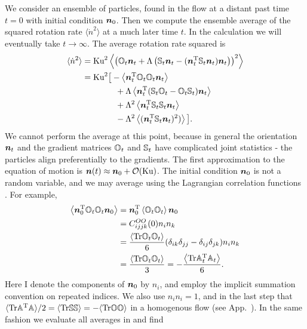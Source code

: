\documentclass[thesis.tex]{subfiles}
\begin{document}
We consider an ensemble of particles, found in the flow at a distant past time $t=0$ with initial condition $\mbox{\boldmath$n$}_0$. Then we compute the ensemble average of the squared rotation rate $\langle \dot n^2\rangle$ at a much later time $t$.
In the calculation we will eventually take $t\to\infty$. The average rotation rate squared is
\begin{align}
	\langle \dot n^2\rangle &= \ku^2\left\langle\left(\ma O_{t}\ve n_{t}+\Lambda\left(\ma S_{t}\ve n_{t}-(\ve n_{t}\transpose\ma S_{t}\ve n_{t})\ve n_{t}\right)\right)^2\right\rangle\nn \nn\\
	&= \ku^2\big[-\left\langle\ve n_{t}\transpose \ma O_{t} \ma O_{t} \ve n_{t}\right\rangle \nn\\
	&\qquad\qquad+ \Lambda\left\langle\ve n_{t}\transpose(\ma S_{t}\ma O_{t} - \ma O_{t}\ma S_{t})\ve n_t\right\rangle \nn\\
	&\qquad\qquad+ \Lambda^2\left\langle\ve n_{t}\transpose\ma S_{t}\ma S_{t}\ve n_{t}\right\rangle \nn\\
	&\qquad\qquad-  \Lambda^2\left\langle(\ve n_{t}\transpose\ma S_{t}\ve n_{t})^2)\right\rangle\big].\eqnlab{ndotsquared}
\end{align}
We cannot perform the average at this point, because in general the orientation $\mbox{\boldmath$n$}_t$ and the gradient matrices $\mathbb{O}_t$ and $\mathbb{S}_t$ have complicated joint statistics - the particles align preferentially to the gradients. 
The first approximation to the equation of motion  is $\mbox{\boldmath$n$}(t) \approx \mbox{\boldmath$n$}_0 + \mathcal O(\mbox{Ku})$.
The initial condition $\mbox{\boldmath$n$}_0$ is not a random variable, and we may average using the Lagrangian correlation functions . For example,
\begin{align*}
 	\left\langle\mbox{\boldmath$n$}_{0}^{\mathrm T} \mathbb{O}_{t} \mathbb{O}_{t} \mbox{\boldmath$n$}_{0}\right\rangle&=\mbox{\boldmath$n$}_{0}^{\mathrm T}\left\langle \mathbb{O}_{t} \mathbb{O}_{t} \right\rangle\mbox{\boldmath$n$}_{0} \\
 	&= C^{OO}_{ijjk}(0)n_in_k\\
 	&= \frac{\left\langle \mbox{Tr} \mathbb{O}_t\mathbb{O}_t\right\rangle}{6}( \delta_{ik}\delta_{jj}-\delta_{ij}\delta_{jk})n_in_k\\
 	&=\frac{\left\langle \mbox{Tr} \mathbb{O}_t\mathbb{O}_t\right\rangle}{3} = -\frac{\left\langle \mbox{Tr} \mathbb{A}_t^{\mathrm T}\mathbb{A}_t\right\rangle}{6}.
 \end{align*}
Here I denote the components of $\mbox{\boldmath$n$}_0$ by $n_i$, and employ the implicit summation convention on repeated indices. We also use $n_in_i=1$, and in the last step that $\langle\mbox{Tr}\mathbb{A}^{\mathrm T} \mathbb{A}\rangle/2=\langle\mbox{Tr}\mathbb{S}\mathbb{S}\rangle=-\langle\mbox{Tr}\mathbb{O}\mathbb{O}\rangle$ in a homogenous flow (see App.~). In the same fashion we evaluate all averages in  and find
\end{document}
